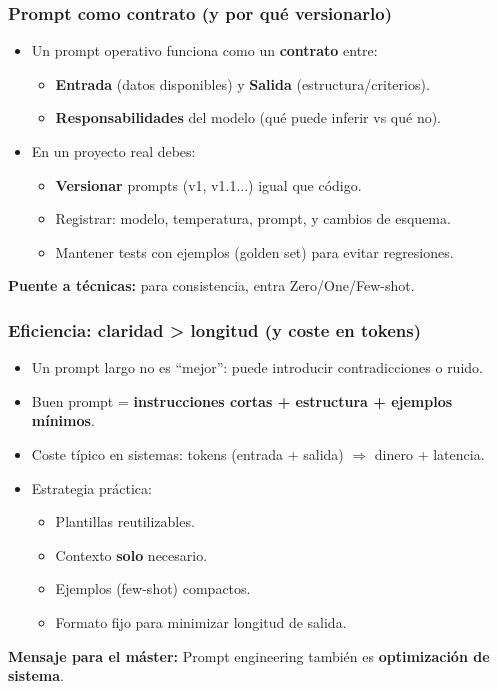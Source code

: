 \documentclass[aspectratio=169]{beamer}
\begin{document}
\begin{frame}\frametitle{Prompt como contrato (y por qué versionarlo)}
\begin{itemize}
    \item Un prompt operativo funciona como un \textbf{contrato} entre:
    \begin{itemize}
        \item \textbf{Entrada} (datos disponibles) y \textbf{Salida} (estructura/criterios).
        \item \textbf{Responsabilidades} del modelo (qué puede inferir vs qué no).
    \end{itemize}
    \item En un proyecto real debes:
    \begin{itemize}
        \item \textbf{Versionar} prompts (v1, v1.1...) igual que código.
        \item Registrar: modelo, temperatura, prompt, y cambios de esquema.
        \item Mantener tests con ejemplos (golden set) para evitar regresiones.
    \end{itemize}
\end{itemize}

\vspace{0.3em}
\textbf{Puente a técnicas:} para consistencia, entra Zero/One/Few-shot.
\end{frame}

\begin{frame}\frametitle{Eficiencia: claridad > longitud (y coste en tokens)}
\begin{itemize}
    \item Un prompt largo no es “mejor”: puede introducir contradicciones o ruido.
    \item Buen prompt = \textbf{instrucciones cortas + estructura + ejemplos mínimos}.
    \item Coste típico en sistemas: tokens (entrada + salida) $\Rightarrow$ dinero + latencia.
    \item Estrategia práctica:
    \begin{itemize}
        \item Plantillas reutilizables.
        \item Contexto \textbf{solo} necesario.
        \item Ejemplos (few-shot) compactos.
        \item Formato fijo para minimizar longitud de salida.
    \end{itemize}
\end{itemize}

\vspace{0.3em}
\textbf{Mensaje para el máster:} Prompt engineering también es \textbf{optimización de sistema}.
\end{frame}
\end{document}
